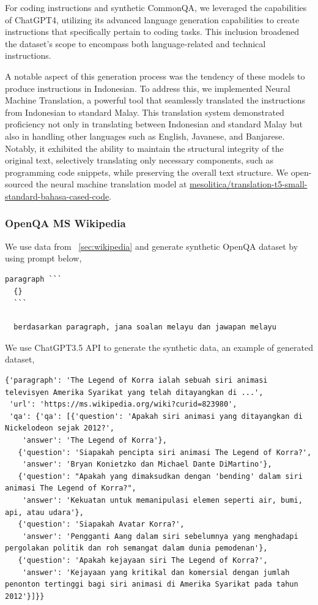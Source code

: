 \documentclass{article}
\begin{document}
For coding instructions and synthetic CommonQA, we leveraged the capabilities of ChatGPT4, utilizing its advanced language generation capabilities to create instructions that specifically pertain to coding tasks. This inclusion broadened the dataset's scope to encompass both language-related and technical instructions.

A notable aspect of this generation process was the tendency of these models to produce instructions in Indonesian. To address this, we implemented Neural Machine Translation, a powerful tool that seamlessly translated the instructions from Indonesian to standard Malay. This translation system demonstrated proficiency not only in translating between Indonesian and standard Malay but also in handling other languages such as English, Javanese, and Banjarese. Notably, it exhibited the ability to maintain the structural integrity of the original text, selectively translating only necessary components, such as programming code snippets, while preserving the overall text structure. We open-sourced the neural machine translation model at \href{https://huggingface.co/mesolitica/translation-t5-small-standard-bahasa-cased-code}{mesolitica/translation-t5-small-standard-bahasa-cased-code}.

\subsubsection{OpenQA MS Wikipedia}

We use data from ~\ref{sec:wikipedia} and generate synthetic OpenQA dataset by using prompt below,

\begin{lstlisting}[]
  paragraph ```
  {}
  ```
  
  berdasarkan paragraph, jana soalan melayu dan jawapan melayu
\end{lstlisting}

We use ChatGPT3.5 API to generate the synthetic data, an example of generated dataset,

\begin{lstlisting}[]
  {'paragraph': 'The Legend of Korra ialah sebuah siri animasi televisyen Amerika Syarikat yang telah ditayangkan di ...',
 'url': 'https://ms.wikipedia.org/wiki?curid=823980',
 'qa': {'qa': [{'question': 'Apakah siri animasi yang ditayangkan di Nickelodeon sejak 2012?',
    'answer': 'The Legend of Korra'},
   {'question': 'Siapakah pencipta siri animasi The Legend of Korra?',
    'answer': 'Bryan Konietzko dan Michael Dante DiMartino'},
   {'question': "Apakah yang dimaksudkan dengan 'bending' dalam siri animasi The Legend of Korra?",
    'answer': 'Kekuatan untuk memanipulasi elemen seperti air, bumi, api, atau udara'},
   {'question': 'Siapakah Avatar Korra?',
    'answer': 'Pengganti Aang dalam siri sebelumnya yang menghadapi pergolakan politik dan roh semangat dalam dunia pemodenan'},
   {'question': 'Apakah kejayaan siri The Legend of Korra?',
    'answer': 'Kejayaan yang kritikal dan komersial dengan jumlah penonton tertinggi bagi siri animasi di Amerika Syarikat pada tahun 2012'}]}}
    
\end{lstlisting}
\end{document}
